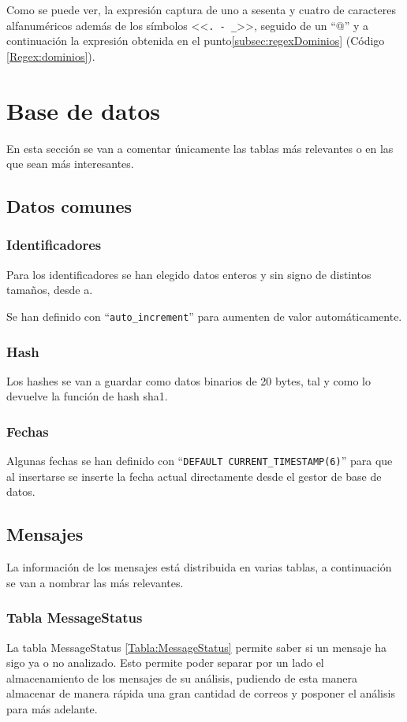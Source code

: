 Como se puede ver, la expresión captura de uno a sesenta y cuatro de caracteres alfanuméricos además de los símbolos <<\verb!. - _!>>, seguido de un “@” y a continuación la expresión obtenida en el punto\ref{subsec:regexDominios} (Código \ref{Regex:dominios}).

\section{Base de datos}
En esta sección se van a comentar únicamente las tablas más relevantes o en las que sean más interesantes. 
\subsection{Datos comunes}
\subsubsection{Identificadores}
Para los identificadores se han elegido datos enteros y sin signo de distintos tamaños, desde a.

Se han definido con “\verb!auto_increment!” para aumenten de valor automáticamente. 

\subsubsection{Hash}
Los hashes se van a guardar como datos binarios de 20 bytes, tal y como lo devuelve la función de hash sha1. 

\subsubsection{Fechas}
Algunas fechas se han definido con “\verb!DEFAULT CURRENT_TIMESTAMP(6)!” para que al insertarse se inserte la fecha actual directamente desde el gestor de base de datos. 

\subsection{Mensajes}
La información de los mensajes está distribuida en varias tablas, a continuación se van a nombrar las más relevantes. 

\subsubsection{Tabla MessageStatus}
La tabla MessageStatus \ref{Tabla:MessageStatus} permite saber si un mensaje ha sigo ya o no analizado. Esto permite poder separar por un lado el almacenamiento de los mensajes de su análisis, pudiendo de esta manera almacenar de manera rápida una gran cantidad de correos y posponer el análisis para más adelante. 

